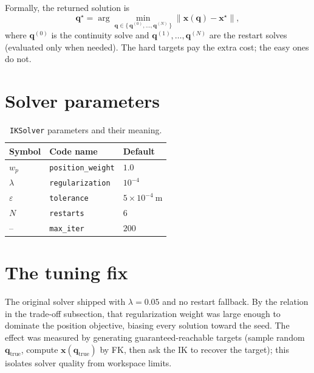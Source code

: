 \documentclass[11pt]{article}
\begin{document}
Formally, the returned solution is
\begin{equation}
\bm{q}^\star=
\arg\min_{\bm{q}\in\{\,\bm{q}^{(0)},\dots,\bm{q}^{(N)}\,\}}
   \big\lVert \bm{x}(\bm{q})-\bm{x}^\star\big\rVert,
\end{equation}
where $\bm{q}^{(0)}$ is the continuity solve and
$\bm{q}^{(1)},\dots,\bm{q}^{(N)}$ are the restart solves (evaluated only when
needed). The hard targets pay the extra cost; the easy ones do not.

\section{Solver parameters}

\begin{table}[h]
\centering
\caption{\texttt{IKSolver} parameters and their meaning.}
\label{tab:params}
\small
\begin{tabular}{lll}
\toprule
Symbol & Code name & Default \\
\midrule
$w_p$         & \texttt{position\_weight} & $1.0$ \\
$\lambda$     & \texttt{regularization}   & $10^{-4}$ \\
$\varepsilon$ & \texttt{tolerance}        & $5\times10^{-4}\ \si{\meter}$ \\
$N$           & \texttt{restarts}         & $6$ \\
--            & \texttt{max\_iter}        & $200$ \\
\bottomrule
\end{tabular}
\end{table}

\section{The tuning fix}
\label{sec:fix}

The original solver shipped with $\lambda=0.05$ and no restart fallback. By
the relation in the trade-off subsection, that regularization weight was large
enough to dominate the position objective, biasing every solution toward the
seed. The effect was measured by generating guaranteed-reachable targets
(sample random $\bm{q}_{\text{true}}$, compute $\bm{x}(\bm{q}_{\text{true}})$
by FK, then ask the IK to recover the target); this isolates solver quality
from workspace limits.
\end{document}
